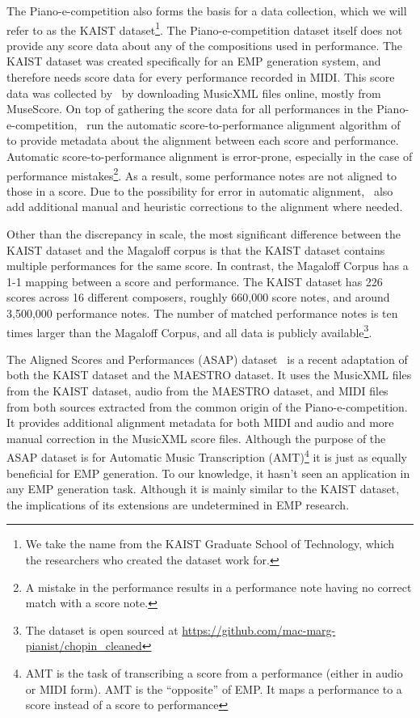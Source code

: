 The Piano-e-competition also forms the basis for a data collection, which we will refer to as the KAIST dataset\footnote{We take the name from the KAIST Graduate School of Technology, which the researchers who created the dataset work for.}. The Piano-e-competition dataset itself does not provide any score data about any of the compositions used in performance. The KAIST dataset was created specifically for an EMP generation system, and therefore needs score data for every performance recorded in MIDI. This score data was collected by~\citet{jeong2019virtuosonet} by downloading MusicXML files online, mostly from MuseScore. On top of gathering the score data for all performances in the Piano-e-competition,~\citet{jeong2019virtuosonet} run the automatic score-to-performance alignment algorithm of~\citet{nakamura2017performance} to provide metadata about the alignment between each score and performance. Automatic score-to-performance alignment is error-prone, especially in the case of performance mistakes\footnote{A mistake in the performance results in a performance note having no correct match with a score note.}. As a result, some performance notes are not aligned to those in a score. Due to the possibility for error in automatic alignment,~\citet{jeong2019virtuosonet} also add additional manual and heuristic corrections to the alignment where needed. 

Other than the discrepancy in scale, the most significant difference between the KAIST dataset and the Magaloff corpus is that the KAIST dataset contains multiple performances for the same score. In contrast, the Magaloff Corpus has a 1-1 mapping between a score and performance. The KAIST dataset has 226 scores across 16 different composers, roughly 660,000 score notes, and around 3,500,000 performance notes. The number of matched performance notes is ten times larger than the Magaloff Corpus, and all data is publicly available\footnote{The dataset is open sourced at \url{https://github.com/mac-marg-pianist/chopin_cleaned}}. 

The Aligned Scores and Performances (ASAP) dataset~\cite{foscarin2020asap} is a recent adaptation of both the KAIST dataset and the MAESTRO dataset. It uses the MusicXML files from the KAIST dataset, audio from the MAESTRO dataset, and MIDI files from both sources extracted from the common origin of the Piano-e-competition. It provides additional alignment metadata for both MIDI and audio and more manual correction in the MusicXML score files. Although the purpose of the ASAP dataset is for Automatic Music Transcription (AMT)\footnote{AMT is the task of transcribing a score from a performance (either in audio or MIDI form). AMT is the ``opposite'' of EMP. It maps a performance to a score instead of a score to performance} it is just as equally beneficial for EMP generation. To our knowledge, it hasn't seen an application in any EMP generation task. Although it is mainly similar to the KAIST dataset, the implications of its extensions are undetermined in EMP research. 


